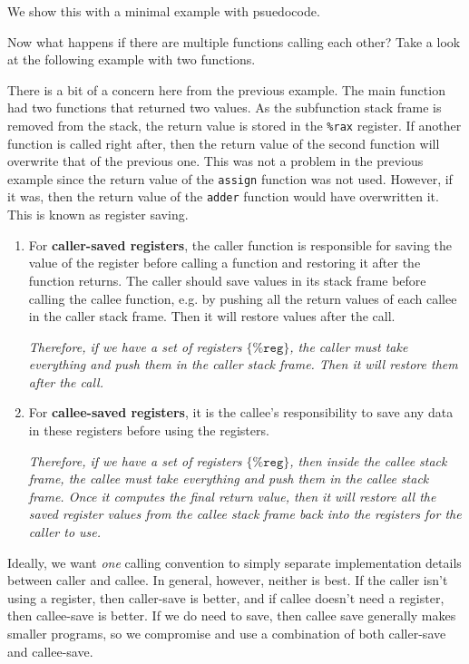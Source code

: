   \begin{example}
    We show this with a minimal example with psuedocode. 
  \end{example}


  \begin{example}
    Now what happens if there are multiple functions calling each other? Take a look at the following example with two functions. 
    
  \end{example}

  There is a bit of a concern here from the previous example. The main function had two functions that returned two values. As the subfunction stack frame is removed from the stack, the return value is stored in the \texttt{\%rax} register. If another function is called right after, then the return value of the second function will overwrite that of the previous one. This was not a problem in the previous example since the return value of the \texttt{assign} function was not used. However, if it was, then the return value of the \texttt{adder} function would have overwritten it. This is known as register saving. 
  \begin{enumerate}
    \item For \textbf{caller-saved registers}, the caller function is responsible for saving the value of the register before calling a function and restoring it after the function returns. The caller should save values in its stack frame before calling the callee function, e.g. by pushing all the return values of each callee in the caller stack frame. Then it will restore values after the call. 

    \begin{center}
      \textit{Therefore, if we have a set of registers $\{\texttt{\%reg}\}$, the caller must take everything and push them in the caller stack frame. Then it will restore them after the call.}
    \end{center}

    \item For \textbf{callee-saved registers}, it is the callee's responsibility to save any data in these registers before using the registers. 

      \begin{center} 
        \textit{Therefore, if we have a set of registers $\{\texttt{\%reg}\}$, then inside the callee stack frame, the callee must take everything and push them in the callee stack frame. Once it computes the final return value, then it will restore all the saved register values from the callee stack frame back into the registers for the caller to use.}
      \end{center}
  \end{enumerate}

  Ideally, we want \textit{one} calling convention to simply separate implementation details between caller and callee. In general, however, neither is best. If the caller isn't using a register, then caller-save is better, and if callee doesn't need a register, then callee-save is better. If we do need to save, then callee save generally makes smaller programs, so we compromise and use a combination of both caller-save and callee-save. 

